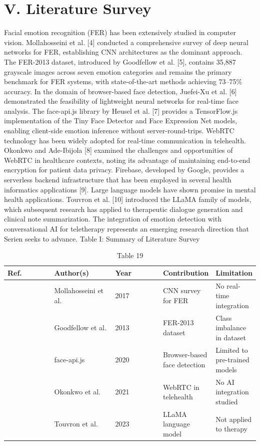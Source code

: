 \documentclass[conference]{IEEEtran}
\begin{document}
\section{V. Literature Survey}
Facial emotion recognition (FER) has been extensively studied in computer vision. Mollahosseini et al. [4] conducted a comprehensive survey of deep neural networks for FER, establishing CNN architectures as the dominant approach. The FER-2013 dataset, introduced by Goodfellow et al. [5], contains 35,887 grayscale images across seven emotion categories and remains the primary benchmark for FER systems, with state-of-the-art methods achieving 73–75\% accuracy.
In the domain of browser-based face detection, Juefei-Xu et al. [6] demonstrated the feasibility of lightweight neural networks for real-time face analysis. The face-api.js library by Heusel et al. [7] provides a TensorFlow.js implementation of the Tiny Face Detector and Face Expression Net models, enabling client-side emotion inference without server-round-trips.
WebRTC technology has been widely adopted for real-time communication in telehealth. Okonkwo and Ade-Ibijola [8] examined the challenges and opportunities of WebRTC in healthcare contexts, noting its advantage of maintaining end-to-end encryption for patient data privacy. Firebase, developed by Google, provides a serverless backend infrastructure that has been employed in several health informatics applications [9].
Large language models have shown promise in mental health applications. Touvron et al. [10] introduced the LLaMA family of models, which subsequent research has applied to therapeutic dialogue generation and clinical note summarization. The integration of emotion detection with conversational AI for teletherapy represents an emerging research direction that Serien seeks to advance.
Table I: Summary of Literature Survey
\begin{table}[t]
\centering
\caption{Table 19}
\begin{tabular}{|p{0.3\linewidth}|p{0.3\linewidth}|p{0.3\linewidth}|p{0.3\linewidth}|p{0.3\linewidth}|}
\hline
Ref. & Author(s) & Year & Contribution & Limitation \\
\hline
[4] & Mollahosseini et al. & 2017 & CNN survey for FER & No real-time integration \\
\hline
[5] & Goodfellow et al. & 2013 & FER-2013 dataset & Class imbalance in dataset \\
\hline
[7] & face-api.js & 2020 & Browser-based face detection & Limited to pre-trained models \\
\hline
[8] & Okonkwo et al. & 2021 & WebRTC in telehealth & No AI integration studied \\
\hline
[10] & Touvron et al. & 2023 & LLaMA language model & Not applied to therapy \\
\hline
\end{tabular}
\end{table}
\end{document}
